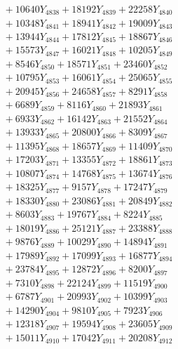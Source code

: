 \documentclass[a4paper,10pt]{article}
\begin{document}
{\begin{align}
&\;  + 10640 Y_{4838} + 18192 Y_{4839} + 22258 Y_{4840} \\[0.3ex]
&\;  + 10348 Y_{4841} + 18941 Y_{4842} + 19009 Y_{4843} \\[0.3ex]
&\;  + 13944 Y_{4844} + 17812 Y_{4845} + 18867 Y_{4846} \\[0.3ex]
&\;  + 15573 Y_{4847} + 16021 Y_{4848} + 10205 Y_{4849} \\[0.3ex]
&\;  + 8546 Y_{4850} + 18571 Y_{4851} + 23460 Y_{4852} \\[0.3ex]
&\;  + 10795 Y_{4853} + 16061 Y_{4854} + 25065 Y_{4855} \\[0.3ex]
&\;  + 20945 Y_{4856} + 24658 Y_{4857} + 8291 Y_{4858} \\[0.5ex]\allowbreak
&\;  + 6689 Y_{4859} + 8116 Y_{4860} + 21893 Y_{4861} \\[0.3ex]
&\;  + 6933 Y_{4862} + 16142 Y_{4863} + 21552 Y_{4864} \\[0.3ex]
&\;  + 13933 Y_{4865} + 20800 Y_{4866} + 8309 Y_{4867} \\[0.3ex]
&\;  + 11395 Y_{4868} + 18657 Y_{4869} + 11409 Y_{4870} \\[0.3ex]
&\;  + 17203 Y_{4871} + 13355 Y_{4872} + 18861 Y_{4873} \\[0.3ex]
&\;  + 10807 Y_{4874} + 14768 Y_{4875} + 13674 Y_{4876} \\[0.3ex]
&\;  + 18325 Y_{4877} + 9157 Y_{4878} + 17247 Y_{4879} \\[0.3ex]
&\;  + 18330 Y_{4880} + 23086 Y_{4881} + 20849 Y_{4882} \\[0.3ex]
&\;  + 8603 Y_{4883} + 19767 Y_{4884} + 8224 Y_{4885} \\[0.3ex]
&\;  + 18019 Y_{4886} + 25121 Y_{4887} + 23388 Y_{4888} \\[0.5ex]\allowbreak
&\;  + 9876 Y_{4889} + 10029 Y_{4890} + 14894 Y_{4891} \\[0.3ex]
&\;  + 17989 Y_{4892} + 17099 Y_{4893} + 16877 Y_{4894} \\[0.3ex]
&\;  + 23784 Y_{4895} + 12872 Y_{4896} + 8200 Y_{4897} \\[0.3ex]
&\;  + 7310 Y_{4898} + 22124 Y_{4899} + 11519 Y_{4900} \\[0.3ex]
&\;  + 6787 Y_{4901} + 20993 Y_{4902} + 10399 Y_{4903} \\[0.3ex]
&\;  + 14290 Y_{4904} + 9810 Y_{4905} + 7923 Y_{4906} \\[0.3ex]
&\;  + 12318 Y_{4907} + 19594 Y_{4908} + 23605 Y_{4909} \\[0.3ex]
&\;  + 15011 Y_{4910} + 17042 Y_{4911} + 20208 Y_{4912} \\[0.3ex]

\end{align}}
\end{document}
